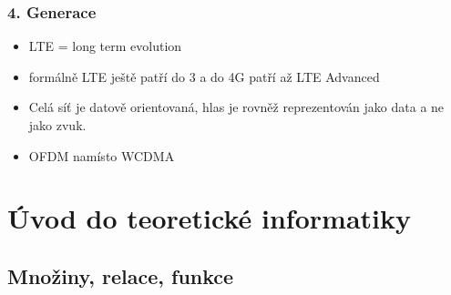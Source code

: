 \documentclass[10pt,a4paper]{article}
\begin{document}
\subsubsection{4. Generace}

\begin{itemize}
\item LTE = long term evolution
\item formálně LTE ještě patří do 3 a do 4G patří až LTE Advanced
\item Celá síť je datově orientovaná, hlas je rovněž reprezentován jako data a ne jako zvuk.
\item OFDM namísto WCDMA
\end{itemize}

\newpage
\section{Úvod do teoretické informatiky}

\subsection{Množiny, relace, funkce}
\end{document}
